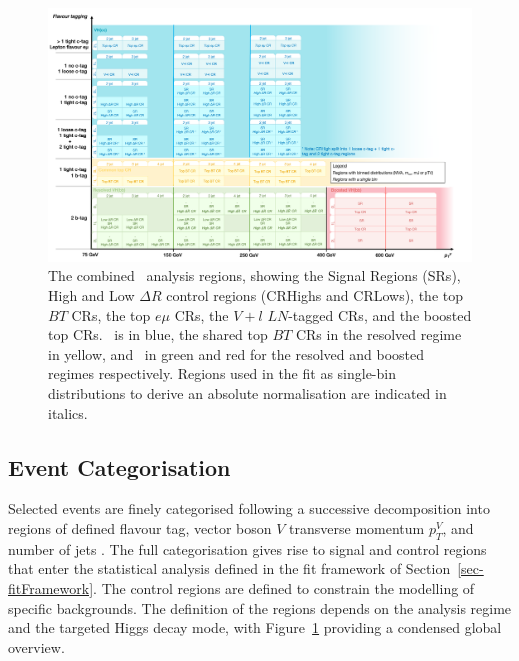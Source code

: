 \clearpage 

\begin{figure}
    \centering
    \includegraphics[width=\textwidth]{Images/VH/Cat/VH_analysis_catCorr.png}
    \caption{The combined \vhbc\ analysis regions, showing the Signal Regions (SRs), High and Low $\Delta R$ control regions (CRHighs and CRLows), the top $BT$ CRs, the top $e\mu$ CRs, the $V+l$ $LN$-tagged CRs, and the boosted top CRs. \vhc\ is in blue, the shared top $BT$ CRs in the resolved regime in yellow, and \vhb\ in green and red for the resolved and boosted regimes respectively. Regions used in the fit as single-bin distributions to derive an absolute normalisation are indicated in italics.} 
    \label{fig:ana-strat-det}
\end{figure} 

\clearpage

\subsection{Event Categorisation}\label{sec-eventCat}
Selected events are finely categorised following a successive decomposition into regions of defined flavour tag, vector boson $V$ transverse momentum $p_T^V$, and number of jets \nj. The full categorisation gives rise to signal and control regions that enter the statistical analysis defined in the fit framework of Section~\ref{sec-fitFramework}. The control regions are defined to constrain the modelling of specific backgrounds. The definition of the regions depends on the analysis regime and the targeted Higgs decay mode, with Figure~\ref{fig:ana-strat-det} providing a condensed global overview.

